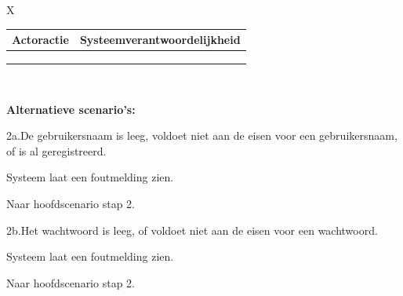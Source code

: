 \begin{xltabular}{\textwidth}{X}
\begin{minipage}[t]{\linewidth}
      \begin{tabularx}{\linewidth}{XX}
         \textbf{Actoractie}                                            & \textbf{Systeemverantwoordelijkheid}                                                    \\
         \hline
         \usecasestep{Speler kiest ervoor om zich te registreren.}      &                                                                                         \\
         \usecasestep{Speler vult een gebruikersnaam en wachtwoord in.} &                                                                                         \\
                                                                        & \usecasestep{Systeem registreert de speler en schrijft 1000 credits bij de speler bij.}
      \end{tabularx}
   \end{minipage} \\

   \hline

   \begin{minipage}[t]{\linewidth}
      \textbf{Alternatieve scenario's:}

      2a.\:De gebruikersnaam is leeg, voldoet niet aan de eisen voor een gebruikersnaam, of is al geregistreerd.
      \begin{smallenumerate}
         \item Systeem laat een foutmelding zien.
         \item Naar hoofdscenario stap 2.
      \end{smallenumerate}
      \bigskip

      2b.\:Het wachtwoord is leeg, of voldoet niet aan de eisen voor een wachtwoord.
      \begin{smallenumerate}
         \item Systeem laat een foutmelding zien.
         \item Naar hoofdscenario stap 2.
      \end{smallenumerate}
   \end{minipage} \\

   \hline

\end{xltabular}

